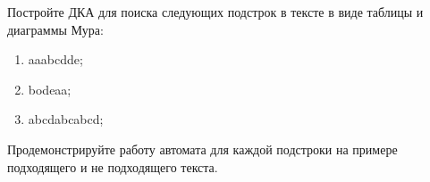 \question 
Постройте ДКА для поиска следующих подстрок в тексте в виде таблицы и диаграммы Мура:
\begin{enumerate}
\item  aaabcdde;
\item  bodeaa;
\item  abcdabcabcd;
\end{enumerate}
Продемонстрируйте работу автомата для каждой подстроки на примере подходящего и не подходящего текста.

